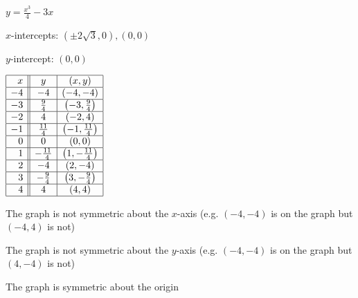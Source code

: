 {$y = \frac{x^3}{4} - 3x$}
{$x$-intercepts: $\left(\pm 2\sqrt{3}, 0\right), (0, 0)$   \smallskip

$y$-intercept: $(0,0)$ \smallskip

$\begin{array}{|r||c|c|}  

\hline
 x & y & (x,y) \\ \hline
 -4 & -4 & (-4, -4) \\  \hline
 -3 & \frac{9}{4} & \left(-3, \frac{9}{4} \right) \\ \hline
 -2 & 4 & (-2, 4) \\ \hline
-1 & \frac{11}{4} & \left(-1, \frac{11}{4}\right) \\ \hline
 0 & 0 & (0,0) \\ \hline
 1 & -\frac{11}{4} & \left(1, -\frac{11}{4}\right) \\ \hline
 2 & -4 & (2, -4) \\ \hline
 3 & -\frac{9}{4} & \left(3, -\frac{9}{4} \right) \\ \hline
 4 & 4 & (4, 4) \\  \hline
 
\end{array} $ \smallskip


\smallskip

The graph is not symmetric about the $x$-axis (e.g. $(-4, -4)$ is on the graph but $(-4, 4)$ is not) \smallskip

The graph is not symmetric about the $y$-axis (e.g. $(-4, -4)$ is on the graph but $(4, -4)$ is not) \smallskip

The graph is symmetric about the origin}